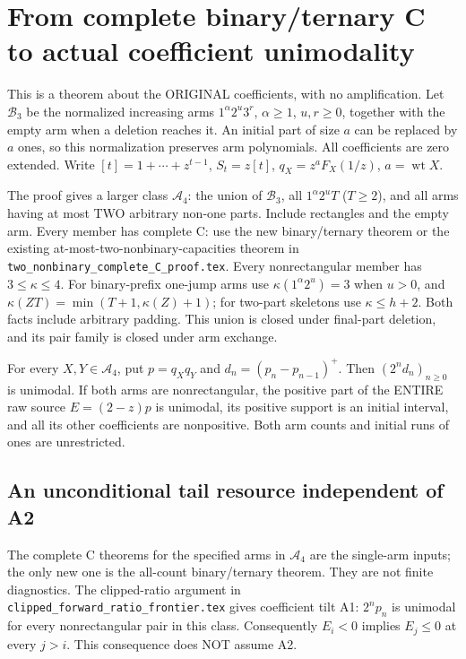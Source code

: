 \section{From complete binary/ternary C to actual coefficient unimodality}
This is a theorem about the ORIGINAL coefficients, with no amplification.
Let $\mathcal B_3$ be the normalized increasing arms
$1^\alpha2^u3^r$, $\alpha\ge1$, $u,r\ge0$, together with the empty
arm when a deletion reaches it. An initial part of size $a$ can be
replaced by $a$ ones, so this normalization preserves arm polynomials.
All coefficients are zero extended. Write $[t]=1+\cdots+z^{t-1}$,
$S_t=z[t]$, $q_X=z^{a}F_X(1/z)$, $a=\operatorname{wt}X$.

The proof gives a larger class $\mathcal A_4$: the union of
$\mathcal B_3$, all $1^\alpha2^uT$ ($T\ge2$), and all arms having
at most TWO arbitrary non-one parts. Include rectangles and the empty
arm. Every member has complete C: use the new binary/ternary theorem
or the existing at-most-two-nonbinary-capacities theorem in
\texttt{two\_nonbinary\_complete\_C\_proof.tex}.
Every nonrectangular member has $3\le\kappa\le4$.
For binary-prefix one-jump arms use $\kappa(1^\alpha2^u)=3$ when
$u>0$, and $\kappa(ZT)=\min(T+1,\kappa(Z)+1)$; for two-part
skeletons use $\kappa\le h+2$. Both facts include arbitrary padding.
This union is closed under final-part deletion, and its pair family
is closed under arm exchange.

\begin{theorem}
For every $X,Y\in\mathcal A_4$, put $p=q_Xq_Y$ and
$d_n=(p_n-p_{n-1})^+$. Then $(2^nd_n)_{n\ge0}$ is unimodal.
If both arms are nonrectangular, the positive part of the ENTIRE
raw source $E=(2-z)p$ is unimodal, its positive support is an initial
interval, and all its other coefficients are nonpositive.
Both arm counts and initial runs of ones are unrestricted.
\end{theorem}

\subsection{An unconditional tail resource independent of A2}
The complete C theorems for the specified arms in $\mathcal A_4$
are the single-arm inputs; the only new one is the all-count
binary/ternary theorem. They are not finite diagnostics. The clipped-ratio argument in
\texttt{clipped\_forward\_ratio\_frontier.tex} gives coefficient tilt A1:
$2^np_n$ is unimodal for every nonrectangular pair in this class.
Consequently $E_i<0$ implies $E_j\le0$ at every $j>i$.
This consequence does NOT assume A2.

